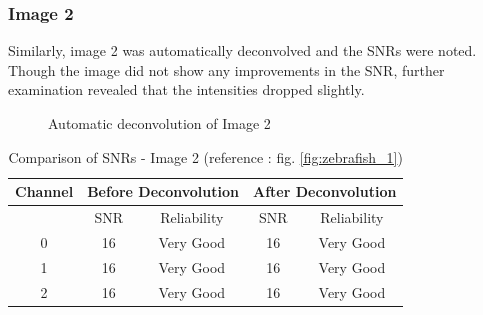 \documentclass{article}
\begin{document}
\subsubsection*{Image 2}
Similarly, image 2 was automatically deconvolved and the SNRs were noted. Though the image did not show any improvements in the SNR, further examination revealed that the intensities dropped slightly. 
\begin{figure}[h!]
\centering
{}
\vspace{5 mm}
\caption{Automatic deconvolution of Image 2}
\label{fig:auto-deconvolve-image2}
\end{figure}
\begin{table}[h!]
\centering
\caption{Comparison of SNRs - Image 2 (reference : fig. \ref{fig:zebrafish_1})}
\begin{tabular}{*5c}
\toprule
Channel &  \multicolumn{2}{c}{Before Deconvolution} & \multicolumn{2}{c}{After Deconvolution}\\
\midrule
{}   & SNR   & Reliability    & SNR   & Reliability \\
0   &  16 & Very Good & 16 & Very Good \\
1   &  16 & Very Good & 16 & Very Good \\
2   &  16 & Very Good & 16 & Very Good \\
\bottomrule
\end{tabular}
\end{table}
\end{document}
